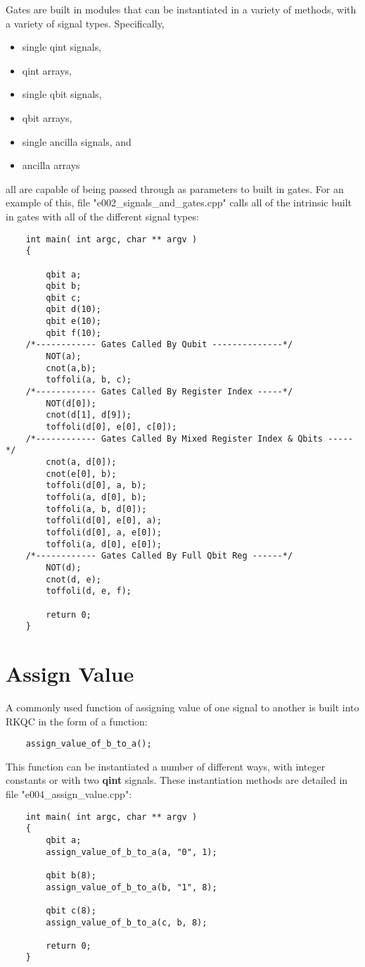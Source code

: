 Gates are built in modules that can be instantiated in a variety of methods, with a variety of signal types. Specifically, 
\begin{itemize}
    \item single qint signals,
    \item qint arrays,
    \item single qbit signals,
    \item qbit arrays,
    \item single ancilla signals, and
    \item ancilla arrays
\end{itemize}
all are capable of being passed through as parameters to built in gates. For an example of this, file "e002\_signals\_and\_gates.cpp" calls all of the intrinsic built in gates with all of the different signal types: 
\begin{lstlisting}
    int main( int argc, char ** argv )
    {
    
        qbit a;
        qbit b;
        qbit c;
        qbit d(10);
    	qbit e(10);
    	qbit f(10);
    /*------------ Gates Called By Qubit --------------*/
        NOT(a);
        cnot(a,b);
        toffoli(a, b, c);	
    /*------------ Gates Called By Register Index -----*/ 
        NOT(d[0]);
        cnot(d[1], d[9]);
        toffoli(d[0], e[0], c[0]);
    /*------------ Gates Called By Mixed Register Index & Qbits -----*/ 
        cnot(a, d[0]);
        cnot(e[0], b);
    	toffoli(d[0], a, b);
    	toffoli(a, d[0], b);
    	toffoli(a, b, d[0]); 
    	toffoli(d[0], e[0], a);
    	toffoli(d[0], a, e[0]);
    	toffoli(a, d[0], e[0]);
    /*------------ Gates Called By Full Qbit Reg ------*/ 
    	NOT(d);
    	cnot(d, e);
    	toffoli(d, e, f);
    
        return 0;
    }
\end{lstlisting}

\section{Assign Value}

A commonly used function of assigning value of one signal to another is built into RKQC in the form of a function:
\begin{lstlisting}
    assign_value_of_b_to_a();
\end{lstlisting}

This function can be instantiated a number of different ways, with integer constants or with two \textbf{qint} signals. These instantiation methods are detailed in file "e004\_assign\_value.cpp":
\begin{lstlisting}
    int main( int argc, char ** argv )
    {
        qbit a;
        assign_value_of_b_to_a(a, "0", 1);
    
        qbit b(8);
        assign_value_of_b_to_a(b, "1", 8);
    
        qbit c(8);
        assign_value_of_b_to_a(c, b, 8);
    
        return 0;
    }
\end{lstlisting}

